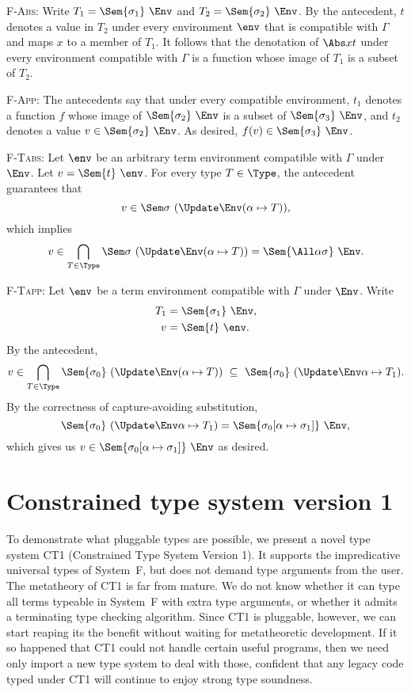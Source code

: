 \documentclass{amsart}
\begin{document}
\textsc{F-Abs}: Write $T_1=\Sem{\sigma_1}~\Env$ and
$T_2=\Sem{\sigma_2}~\Env$. By the antecedent, $t$ denotes a value
in $T_2$ under every environment $\env$ that is compatible with
$\Gamma$ and maps $x$ to a member of $T_1$. It follows that the
denotation of $\Abs xt$ under every environment compatible with
$\Gamma$ is a function whose image of $T_1$ is a subset of $T_2$.

\textsc{F-App}: The antecedents say that under every
compatible environment, $t_1$ denotes a function $f$ whose image
of $\Sem{\sigma_2}~\Env$ is a subset of $\Sem{\sigma_3}~\Env$,
and $t_2$ denotes a value $v\in\Sem{\sigma_2}~\Env$. As desired,
$f(v)\in\Sem{\sigma_3}~\Env$.

\textsc{F-Tabs}: Let $\env$ be an arbitrary term environment
compatible with $\Gamma$ under $\Env$. Let $v=\Sem{t}~\env$.
For every type $T\in\Type$, the antecedent guarantees that
\[
v\in\Sem\sigma~(\Update\Env(\alpha\mapsto T)),
\]
which implies
\[
v\in\bigcap_{T\in\Type}\Sem\sigma~(\Update\Env(\alpha\mapsto T))
=\Sem{\All\alpha\sigma}~\Env.
\]

\textsc{F-Tapp}: Let $\env$ be a term environment compatible with
$\Gamma$ under $\Env$. Write
\begin{align*}
T_1&=\Sem{\sigma_1}~\Env,\\
v&=\Sem{t}~\env.
\end{align*}
By the antecedent,
\[
v\in
\bigcap_{T\in\Type}\Sem{\sigma_0}~(\Update\Env(\alpha\mapsto T))
\ \subseteq\ \Sem{\sigma_0}~(\Update\Env\alpha\mapsto T_1).
\]
By the correctness of capture-avoiding substitution,
\[
\Sem{\sigma_0}~(\Update\Env\alpha\mapsto T_1)
=
\Sem{\sigma_0[\alpha\mapsto\sigma_1]}~\Env,
\]
which gives us $v\in\Sem{\sigma_0[\alpha\mapsto\sigma_1]}~\Env$
as desired.


\section{Constrained type system version 1}

To demonstrate what pluggable types are possible, we present a
novel type system CT1 (Constrained Type System Version 1). It
supports the impredicative universal types of System~F, but does
not demand type arguments from the user. The metatheory of CT1 is
far from mature. We do not know whether it can type all terms
typeable in System~F with extra type arguments, or whether it
admits a terminating type checking algorithm. Since CT1 is
pluggable, however, we can start reaping its the benefit without
waiting for metatheoretic development. If it so happened that CT1
could not handle certain useful programs, then we need only
import a new type system to deal with those, confident that any
legacy code typed under CT1 will continue to enjoy strong type
soundness.
\end{document}
